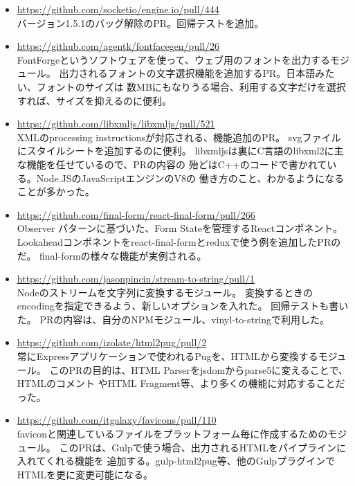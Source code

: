 \documentclass{res}
\begin{document}
\begin{resume}
\begin{itemize}
  \item \url{https://github.com/socketio/engine.io/pull/444} \\
  バージョン1.5.1のバッグ解除のPR。回帰テストを追加。

  \item \url{https://github.com/agentk/fontfacegen/pull/26} \\
  FontForgeというソフトウェアを使って、ウェブ用のフォントを出力するモジュール。
  出力されるフォントの文字選択機能を追加するPR。日本語みたい、フォントのサイズは
  数MBにもなりうる場合、利用する文字だけを選択すれば、サイズを抑えるのに便利。

  \item \url{https://github.com/libxmljs/libxmljs/pull/521} \\
  XMLのprocessing instructionsが対応される、機能追加のPR。
  svgファイルにスタイルシートを追加するのに便利。
  libxmljsは裏にC言語のlibxml2に主な機能を任せているので、PRの内容の
  殆どはC++のコードで書かれている。Node.JSのJavaScriptエンジンのV8の
  働き方のこと、わかるようになることが多かった。

  \item \url{https://github.com/final-form/react-final-form/pull/266} \\
  Observer パターンに基づいた、Form Stateを管理するReactコンポネント。
  Lookaheadコンポネントをreact-final-formとreduxで使う例を追加したPRのだ。
  final-formの様々な機能が実例される。

  \item \url{https://github.com/jasonpincin/stream-to-string/pull/1} \\
  Nodeのストリームを文字列に変換するモジュール。
  変換するときのencodingを指定できるよう、新しいオプションを入れた。
  回帰テストも書いた。
  PRの内容は、自分のNPMモジュール、vinyl-to-stringで利用した。

  \item \url{https://github.com/izolate/html2pug/pull/2} \\
  常にExpressアプリケーションで使われるPugを、HTMLから変換するモジュール。
  このPRの目的は、HTML Parserをjsdomからparse5に変えることで、HTMLのコメント
  やHTML Fragment等、より多くの機能に対応することだった。

  \item \url{https://github.com/itgalaxy/favicons/pull/110} \\
  faviconと関連しているファイルをプラットフォーム毎に作成するためのモジュール。
  このPRは、Gulpで使う場合、出力されるHTMLをパイプラインに入れてくれる機能を
  追加する。gulp-html2pug等、他のGulpプラグインでHTMLを更に変更可能になる。


\end{itemize}
\end{resume}
\end{document}
